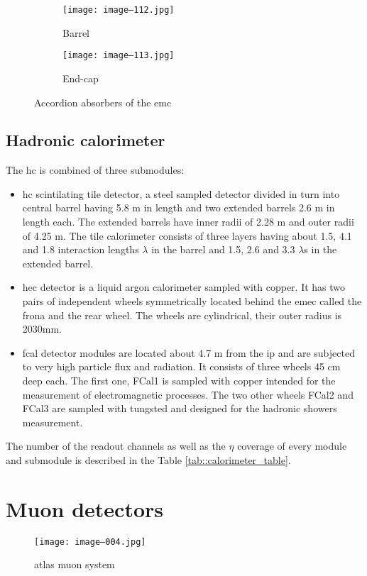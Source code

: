         \begin{figure}[htbp]
        			\begin{subfigure}[t]{0.48\textwidth}
        				\texttt{[image: image--112.jpg]}
        				\caption[Barrel]{Barrel}
        				\label{fig::id}
		\end{subfigure}
        		                \hfill
        \begin{subfigure}[t]{0.48\textwidth} 
				\texttt{[image: image--113.jpg]}
				\caption[End-cap]{End-cap}
				\label{fig::pd}
		\end{subfigure}
			\caption{Accordion absorbers of the \gls{emc}}
			\label{fig::cfrs}
		\end{figure}
	\subsection{Hadronic calorimeter }
	        The \gls{hc} is combined of three submodules:
	\begin{itemize}
		\item \gls{hc} scintilating tile detector, a steel sampled detector divided in turn into central barrel having 5.8 m in length and two extended barrels 2.6 m in length each. The extended barrels have inner radii of 2.28 m and outer radii of 4.25 m.  The tile calorimeter consists of three layers having about 1.5, 4.1 and 1.8 interaction lengths $\lambda$ in the barrel and 1.5, 2.6 and 3.3 $\lambda$s in the extended barrel. 
		\item \gls{hec} detector is a liquid argon calorimeter sampled with copper. It has two pairs of independent wheels symmetrically located behind the \gls{emec} called the frona and the rear wheel. The wheels are cylindrical, their outer radius is 2030mm. 
		\item \gls{fcal} detector modules are located about 4.7 m from the \gls{ip} and are subjected to very high particle flux and radiation. It consists of three wheels 45 cm deep each. The first one, FCal1 is sampled with copper intended for the measurement of electromagnetic processes. The two other wheels FCal2 and FCal3 are sampled with tungsted and designed for the hadronic showers measurement.
	\end{itemize}
	The number of the readout channels as well as the $\eta$ coverage of every module and submodule is described in the Table \ref{tab::calorimeter_table}.
	
\section{Muon detectors}
\label{sect::muons}
    \begin{figure}[htpb]
	\texttt{[image: image--004.jpg]}
	\caption{ \gls{atlas} muon system}
	\label{fig::muon_layout}
	\end{figure}

